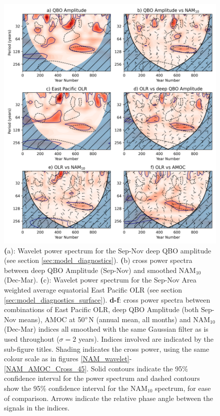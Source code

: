 \begin{figure}[h!]
\begin{center}
\noindent\includegraphics[width = 0.7\linewidth]{Figures/Figures-surface/OLR_wavelet.png}
\caption[Wavelet power spectra for the NAM$_{10}$, deep QBO amplitude and associated surface metrics]{\textbf(a): Wavelet power spectrum for the Sep-Nov deep QBO amplitude (see section \ref{sec:model_diagnostics}). \textbf(b) cross power spectra between deep QBO Amplitude (Sep-Nov) and smoothed NAM$_{10}$ (Dec-Mar). \textbf(c): Wavelet power spectrum for the Sep-Nov  Area weighted average equatorial East Pacific OLR (see section \ref{sec:model_diagnostics_surface}). \textbf{d-f}: cross power spectra between combinations of East Pacific OLR, deep QBO Amplitude (both Sep-Nov means), AMOC at 50$\degree$N (annual mean, all months) and NAM$_{10}$ (Dec-Mar) indices all smoothed with the same Gaussian filter as is used throughout ($\sigma = 2$ years). Indices involved are indicated by the sub-figure titles. Shading indicates the cross power, using the same colour scale as in figures \ref{NAM_wavelet}-\ref{NAM_AMOC_Cross_45}. Solid contours indicate the 95\% confidence interval for the power spectrum and dashed contours show the 95\% confidence interval for the NAM$_{10}$ spectrum, for ease of comparison. Arrows  indicate the relative phase angle between the signals in the indices.}
\label{OLR_wavelet}
\end{center}
\end{figure}

